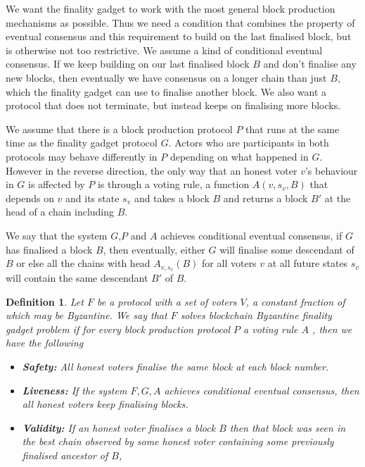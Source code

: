 \documentclass{article}
\newtheorem{definition}[theorem]{Definition}
\begin{document}
We want the finality gadget to work with the most general block production mechanisms as possible. Thus we need a condition that combines the property of eventual consensus and this requirement to build on the last finalised block, but is otherwise not too restrictive.
We assume a kind of conditional eventual consensus.
If we keep building on our last finalised block $B$ and don't finalise any new blocks, then eventually we have consensus on a longer chain than just $B$, which the finality gadget can use to finalise another block.
We also want a protocol that does not terminate, but instead keeps on finalising more blocks. 

We assume that there is a block production protocol $P$ that runs at the same time as the finality gadget protocol $G$. Actors who are participants in both protocols may behave differently in $P$ depending on what happened in $G$.
However in the reverse direction, the only way that an honest voter $v$'s behaviour in $G$ is affected by $P$ is through a voting rule, a function $A(v,s_v,B)$ that depends on $v$ and its state $s_v$ and takes a block $B$ and returns a block $B'$ at the head of a chain including $B$.

We say that the system $G$,$P$ and $A$ achieves conditional eventual consensus, if $G$ has finalised a block $B$, then eventually, either $G$ will finalise some descendant of $B$ or else all the chains with head $A_{v,s_v}(B)$ for all voters $v$ at all future states $s_v$ will contain the same descendant $B'$ of $B$.

\begin{definition} \label{def:finality-gadget} 
Let $F$ be a protocol  with a set of voters $V$, a constant fraction of which may be Byzantine.
We say that $F$ solves {\em blockchain Byzantine finality gadget problem} if for every block production protocol $P$ a voting rule $A$ , then we have the following


\begin{itemize}
\item{\bf Safety:} All honest voters finalise the same block at each block number.
\item{\bf Liveness:} If the system $F,G,A$ achieves conditional eventual consensus, then all honest voters keep finalising blocks.
\item{\bf Validity:} If an honest voter finalises a block $B$ then that block was seen in the best chain observed by some honest voter containing some previously finalised ancestor of $B$,
\end{itemize}

\end{definition}
\end{document}

